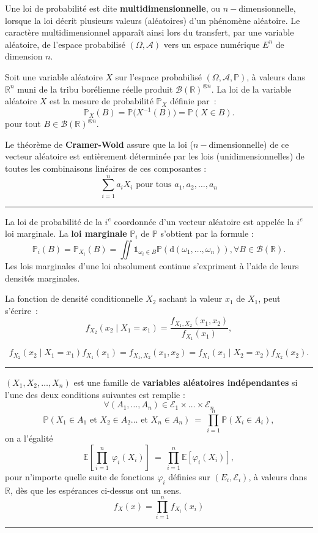 \begin{f}
			
			
Une loi de probabilité est dite \textbf{multidimensionnelle}, ou \(n-\)dimensionnelle, lorsque la loi décrit plusieurs valeurs (aléatoires) d'un phénomène aléatoire.  
Le caractère multidimensionnel apparaît ainsi lors du transfert, par une variable aléatoire, de l'espace probabilisé \((\Omega,\mathcal{A})\) vers un espace numérique \(E^n\) de dimension \(n\). 

Soit une variable aléatoire \(X\) sur l'espace probabilisé \((\Omega, \mathcal A, \mathbb{P})\), à valeurs dans \({\mathbb{R}}^n\) muni de la tribu borélienne réelle produit \({\mathcal {B}(\mathbb{R})}^{\otimes n}\). 
La loi de la variable aléatoire \(X\) est la mesure de probabilité \(\mathbb{P}_X\) définie par~:
\[
\mathbb{P}_X(B) = \mathbb{P}\big(X^{-1}(B)\big) = \mathbb{P}(X \in B).
\]
pour tout \(B \in {\mathcal B(\mathbb R)}^{\otimes n}\).

Le théorème de \textbf{Cramer-Wold} assure que la loi (\(n-\)dimensionnelle) de ce vecteur aléatoire est entièrement déterminée par les lois (unidimensionnelles) de toutes les combinaisons linéaires de ces composantes : 
\[\sum_{i = 1}^n a_i X_i\mbox{ pour tous }a_1, a_2, \dots, a_n\]


\end{f}
\hrule

\begin{f}
La loi de probabilité de la \(i^e\) coordonnée d'un vecteur aléatoire est appelée la \(i^e\) loi marginale. La \textbf{loi marginale} \(\mathbb{P}_i\) de \(\mathbb{P}\) s'obtient par la formule :
\[
\mathbb{P}_i(B) = \mathbb{P}_{X_i}(B) = \iint { \mathds{1}}_{\omega_i\in B} \mathbb{P}(\mathrm{d}(\omega_1,\dots,\omega_n)), \forall  B \in \mathcal B(\mathbb{R}).
\]
Les lois marginales d'une loi absolument continue s'expriment à l'aide de leurs densités marginales.


La fonction de densité conditionnelle \(X_2\) sachant la valeur \(x_1\) de \(X_1\), peut s'écrire~:
\[
f_{X_2}(x_2 \mid X_1=x_1) = \frac{f_{X_1, X_2}(x_1,x_2)}{f_{X_1}(x_1)}, 
\]

\[
f_{X_2}(x_2 \mid X_1=x_1)f_{X_1}(x_1) = f_{X_1,X_2}(x_1, x_2) = f_{X_1}(x_1 \mid X_2=x_2)f_{X_2}(x_2). 
\]
\end{f}
\hrule

	\begin{f}[Indépendance]
\((X_1, X_2, \dots,X_n)\) est une famille de \textbf{variables aléatoires indépendantes} si l'une des deux conditions suivantes est remplie :
\[
\forall (A_1,\dots,A_n)\in\mathcal{E}_1\times\dots\times\mathcal{E}_n
\]
\[
\mathbb{P}(X_1\in A_1\text{ et }X_2\in A_2\dots\text{ et }X_n\in A_n)\ =\ \prod_{i=1}^n\mathbb{P}(X_i\in A_i),
\]
on a l'égalité
\[
\mathbb{E}\left[\prod_{i=1}^n\ \varphi_i(X_i)\right]\ =\ \prod_{i=1}^n\mathbb{E}\left[\varphi_i(X_i)\right],
\]
pour n'importe quelle suite de fonctions \(\varphi_i\) définies sur \((E_i,\mathcal{E}_i)\), à valeurs dans \(\mathbb{R}\), dès que les espérances ci-dessus ont un sens.
\[
f_X(x)= \prod_{i=1}^{n}f_{X_i}(x_i)
\]
\end{f}
\hrule



